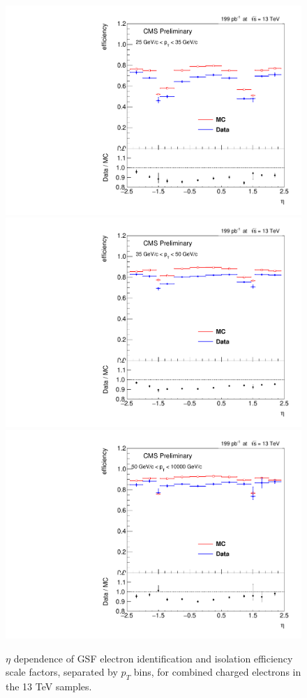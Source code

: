 \begin{figure}
\centering
\includegraphics[width=0.32\linewidth]{plots/efficiency/13_zeegsfsel_combined/PtBins_eta_pt0.pdf}
\includegraphics[width=0.32\linewidth]{plots/efficiency/13_zeegsfsel_combined/PtBins_eta_pt1.pdf}
\includegraphics[width=0.32\linewidth]{plots/efficiency/13_zeegsfsel_combined/PtBins_eta_pt2.pdf}
\caption{$\eta$ dependence of GSF electron identification and isolation efficiency scale factors, separated by $p_T$ bins, for combined charged electrons in the 13 TeV samples.}
\label{fig:Eff:el:13:GSFSel:com}
\end{figure}

